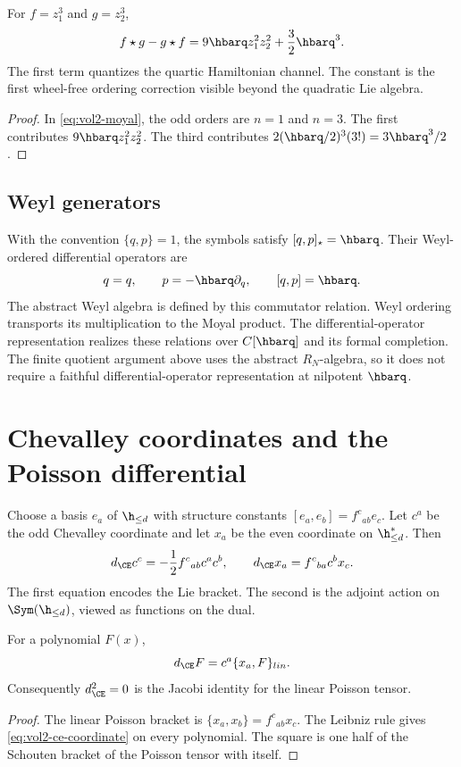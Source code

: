 \begin{calculation}
For $f=z_1^3$ and $g=z_2^3$,
\[
 f\star g-g\star f
 =9\hbarq z_1^2z_2^2+\frac32\hbarq^3.
\]
The first term quantizes the quartic Hamiltonian channel.  The constant is the first wheel-free ordering correction visible beyond the quadratic Lie algebra.
\end{calculation}
\begin{proof}
In \eqref{eq:vol2-moyal}, the odd orders are $n=1$ and $n=3$.  The first contributes $9\hbarq z_1^2z_2^2$.  The third contributes $2(\hbarq/2)^3(3!)=3\hbarq^3/2$.
\end{proof}

\section{Weyl generators}
With the convention $\{q,p\}=1$, the symbols satisfy
$[q,p]_\star=\hbarq$.
Their Weyl-ordered differential operators are
\[
 \widehat q=q,\qquad \widehat p=-\hbarq\partial_q,
 \qquad [\widehat q,\widehat p]=\hbarq.
\]
The abstract Weyl algebra is defined by this commutator relation.
Weyl ordering transports its multiplication to the Moyal product.
The differential-operator representation realizes these relations over
$\C[\hbarq]$ and its formal completion.
The finite quotient argument above uses the abstract $R_N$-algebra,
so it does not require a faithful differential-operator representation at nilpotent $\hbarq$.

\chapter{Chevalley coordinates and the Poisson differential}
Choose a basis $e_a$ of $\h_{\le d}$ with structure constants $[e_a,e_b]=f^c{}_{ab}e_c$.  Let $c^a$ be the odd Chevalley coordinate and let $x_a$ be the even coordinate on $\h_{\le d}^*$.  Then
\begin{equation}\label{eq:vol2-ce-coordinate}
 d_{\CE}c^c=-\frac12f^c{}_{ab}c^ac^b,
 \qquad
 d_{\CE}x_a=f^c{}_{ba}c^b x_c.
\end{equation}
The first equation encodes the Lie bracket.  The second is the adjoint action on $\Sym(\h_{\le d})$, viewed as functions on the dual.

\begin{proposition}
For a polynomial $F(x)$,
\[
 d_{\CE}F
 =c^a\{x_a,F\}_{\mathrm{lin}}.
\]
Consequently $d_{\CE}^2=0$ is the Jacobi identity for the linear Poisson tensor.
\end{proposition}
\begin{proof}
The linear Poisson bracket is $\{x_a,x_b\}=f^c{}_{ab}x_c$.  The Leibniz rule gives \eqref{eq:vol2-ce-coordinate} on every polynomial.  The square is one half of the Schouten bracket of the Poisson tensor with itself.
\end{proof}

